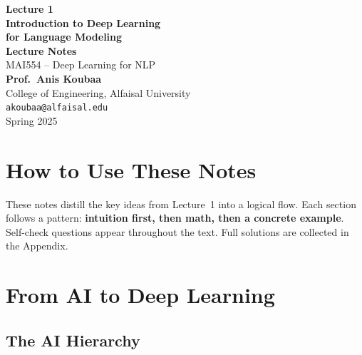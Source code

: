 \documentclass[11pt,a4paper]{article}
\begin{document}
\begin{titlepage}
\centering
\vspace*{3cm}

{\Huge\bfseries\color{alfaisalgreen} Lecture 1}\\[0.8cm]
{\LARGE\bfseries Introduction to Deep Learning\\[0.3cm] for Language Modeling}\\[1.5cm]

{\Large\textbf{Lecture Notes}}\\[0.5cm]
{\large MAI554 -- Deep Learning for NLP}\\[2cm]

{\large\textbf{Prof.\ Anis Koubaa}}\\[0.3cm]
{\normalsize College of Engineering, Alfaisal University}\\[0.2cm]
{\normalsize\texttt{akoubaa@alfaisal.edu}}\\[3cm]

{\normalsize Spring 2025}

\vfill
\end{titlepage}

\section*{How to Use These Notes}

These notes distill the key ideas from Lecture~1 into a logical flow. Each section follows a pattern: \textbf{intuition first, then math, then a concrete example}. Self-check questions appear throughout the text. Full solutions are collected in the Appendix.

\tableofcontents
\newpage

\section{From AI to Deep Learning}

\subsection{The AI Hierarchy}
\end{document}
